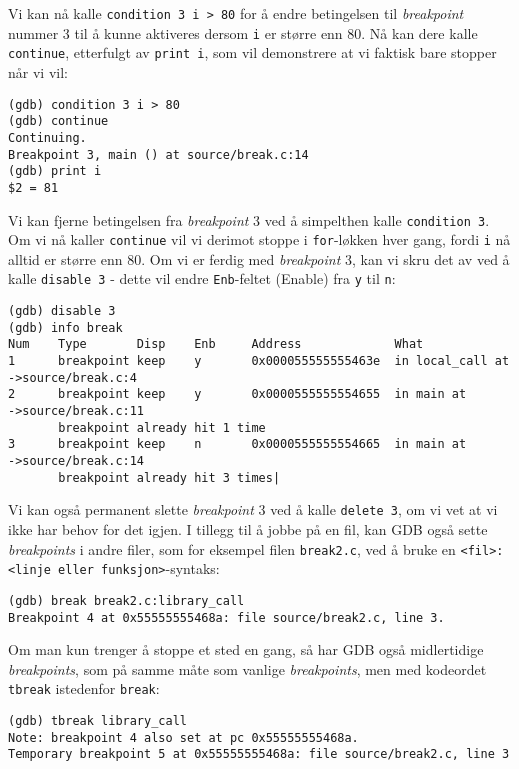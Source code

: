 Vi kan nå kalle \verb|condition 3 i > 80| for å endre betingelsen til \textit{breakpoint} nummer 3 til å kunne aktiveres dersom \verb|i| er større enn 80. Nå kan dere kalle \verb|continue|, etterfulgt av \verb|print i|, som vil demonstrere at vi faktisk bare stopper når vi vil:

\begin{verbatim}
(gdb) condition 3 i > 80
(gdb) continue
Continuing.
Breakpoint 3, main () at source/break.c:14
(gdb) print i
$2 = 81
\end{verbatim}

Vi kan fjerne betingelsen fra \textit{breakpoint} 3 ved å simpelthen kalle \verb|condition 3|. Om vi nå kaller \verb|continue| vil vi derimot stoppe i \verb|for|-løkken hver gang, fordi \verb|i| nå alltid er større enn 80. Om vi er ferdig med \textit{breakpoint} 3, kan vi skru det av ved å kalle \verb|disable 3| - dette vil endre \verb|Enb|-feltet (Enable) fra \verb|y| til \verb|n|:

\begin{lstlisting}[mathescape=true,keywordstyle=\color{black}]
(gdb) disable 3
(gdb) info break
Num    Type       Disp    Enb     Address             What
1      breakpoint keep    y       0x000055555555463e  in local_call at
->source/break.c:4
2      breakpoint keep    y       0x0000555555554655  in main at
->source/break.c:11
       breakpoint already hit 1 time
3      breakpoint keep    n       0x0000555555554665  in main at
->source/break.c:14
       breakpoint already hit 3 times|
\end{lstlisting}

Vi kan også permanent slette \textit{breakpoint} 3 ved å kalle \verb|delete 3|, om vi vet at vi ikke har behov for det igjen. I tillegg til å jobbe på en fil, kan GDB også sette \textit{breakpoints} i andre filer, som for eksempel filen \verb|break2.c|, ved å bruke en \verb|<fil>:<linje eller funksjon>|-syntaks:

\begin{lstlisting}[mathescape=true,keywordstyle=\color{black}]  
(gdb) break break2.c:library_call
Breakpoint 4 at 0x55555555468a: file source/break2.c, line 3.
\end{lstlisting}


Om man kun trenger å stoppe et sted en gang, så har GDB også midlertidige \textit{breakpoints}, som på samme måte som vanlige \textit{breakpoints}, men med kodeordet \verb|tbreak| istedenfor \verb|break|:

\begin{lstlisting}[mathescape=true,keywordstyle=\color{black}]
(gdb) tbreak library_call
Note: breakpoint 4 also set at pc 0x55555555468a.
Temporary breakpoint 5 at 0x55555555468a: file source/break2.c, line 3
\end{lstlisting}


